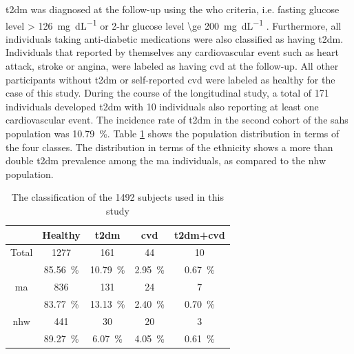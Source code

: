 \documentclass[journal,comsoc]{IEEEtran}
\renewcommand{\^}{\hat}  %
\begin{document}
\ac{t2dm} was diagnosed at the follow-up using the \ac{who} criteria, i.e. fasting glucose level \SI[round-mode = off,group-separator = {,}]{> 126}{\milli\gram\per\deci\liter} or 2-hr glucose level \SI[round-mode = off,group-separator = {,}]{\ge 200}{\milli\gram\per\deci\liter} \cite{organization_definition_2006}. Furthermore, all individuals taking anti-diabetic medications were also classified as having \ac{t2dm}. Individuals that reported by themselves any cardiovascular event such as heart attack, stroke or angina, were labeled as having \ac{cvd} at the follow-up. All other participants without \ac{t2dm} or self-reported \ac{cvd} were labeled as healthy for the case of this study. During the course of the longitudinal study, a total of \num{171} individuals developed \ac{t2dm} with \num{10} individuals also reporting at least one cardiovascular event. The incidence rate of \ac{t2dm} in the second cohort of the \ac{sahs} population was \SI{10.79}{\percent}. Table \ref{tab:patients} shows the population distribution in terms of the four classes. The distribution in terms of the ethnicity shows a more than double \ac{t2dm} prevalence among the \ac{ma} individuals, as compared to the \ac{nhw} population.
%
\begin{table}[!h]
  \centering
  \renewcommand{\arraystretch}{1.3}
  \caption{The classification of the \num[group-minimum-digits=4, group-separator = {,}]{1492} subjects used in this study}
  \centering
  \begin{tabular}{c c c c c}
    \toprule
    & Healthy &  \ac{t2dm} & \ac{cvd} & \ac{t2dm}+\ac{cvd}\\
    \midrule \midrule
    Total & \num[group-minimum-digits=4, group-separator = {,}]{1277} & \num{161} & \num{44} & \num{10}\\
    &\SI{85.56}{\percent} & \SI{10.79}{\percent} & \SI[round-precision=3]{2.95}{\percent} & \SI[round-precision=2]{0.67}{\percent} \\
    \midrule
    \ac{ma} & \num[group-minimum-digits=4, group-separator = {,}]{836} & \num{131} & \num{24} & \num{7}\\
    &\SI{83.77}{\percent} & \SI{13.13}{\percent} & \SI[round-precision=3]{2.40}{\percent} & \SI[round-precision=2]{0.70}{\percent} \\
    \midrule
    \ac{nhw} & \num[group-minimum-digits=4, group-separator = {,}]{441} & \num{30} & \num{20} & \num{3}\\
    &\SI{89.27}{\percent} & \SI{6.07}{\percent} & \SI[round-precision=3]{4.05}{\percent} & \SI[round-precision=2]{0.61}{\percent} \\
    \bottomrule
  \end{tabular}
  \label{tab:patients}
\end{table}
\end{document}
